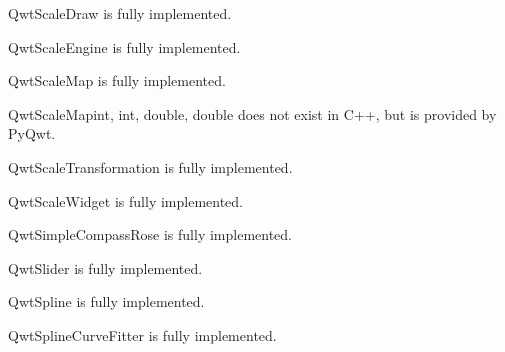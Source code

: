 \documentclass[a4paper,10pt,english]{manual}
\begin{document}
\hypertarget{PyQt4.Qwt5.QwtScaleDraw}{}\begin{classdesc}{QwtScaleDraw}{}
is fully implemented.
\end{classdesc}

\hypertarget{PyQt4.Qwt5.QwtScaleEngine}{}\begin{classdesc}{QwtScaleEngine}{}
is fully implemented.
\end{classdesc}

\hypertarget{PyQt4.Qwt5.QwtScaleMap}{}\begin{classdesc}{QwtScaleMap}{}
is fully implemented.

\hypertarget{QwtScaleMap}{}\begin{cfuncdesc}{}{QwtScaleMap}{int, int, double, double}
does not exist in C++, but is provided by PyQwt.
\end{cfuncdesc}
\end{classdesc}

\hypertarget{PyQt4.Qwt5.QwtScaleTransformation}{}\begin{classdesc}{QwtScaleTransformation}{}
is fully implemented.
\end{classdesc}

\hypertarget{PyQt4.Qwt5.QwtScaleWidget}{}\begin{classdesc}{QwtScaleWidget}{}
is fully implemented.
\end{classdesc}

\hypertarget{PyQt4.Qwt5.QwtSimpleCompassRose}{}\begin{classdesc}{QwtSimpleCompassRose}{}
is fully implemented.
\end{classdesc}

\hypertarget{PyQt4.Qwt5.QwtSlider}{}\begin{classdesc}{QwtSlider}{}
is fully implemented.
\end{classdesc}

\hypertarget{PyQt4.Qwt5.QwtSpline}{}\begin{classdesc}{QwtSpline}{}
is fully implemented.
\end{classdesc}

\hypertarget{PyQt4.Qwt5.QwtSplineCurveFitter}{}\begin{classdesc}{QwtSplineCurveFitter}{}
is fully implemented.
\end{classdesc}
\end{document}
